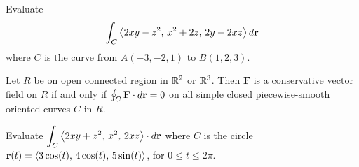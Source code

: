 \documentclass[../mathNotesPreamble]{subfiles}
\begin{document}
  \begin{ex*}
    Evaluate
      \[\int_C {\left\langle 2xy-z^2,\, x^2+2z,\,2y-2xz \right\rangle}\,d{\mathbf{r}}\]
    where $C$ is the curve from $A(-3,-2,1)$ to $B(1,2,3)$.
  \end{ex*}
  \pagebreak

  \begin{thmBox*}
    Let $R$ be on open connected region in $\mathbb{R}^2$ or $\mathbb{R}^3$. Then $\mathbf F$ is a conservative vector field on $R$ if and only if $\oint_C \mathbf F\cdot d{\mathbf{r}}=0$ on all simple closed piecewise-smooth oriented curves $C$ in $R$.
  \end{thmBox*}

  \begin{ex*}
    Evaluate $\displaystyle \int_C {\left\langle 2xy+z^2,\,x^2,\,2xz \right\rangle}\cdot d{\mathbf{r}}$ where $C$ is the circle \newline${\mathbf{r}}(t)={\left\langle 3\cos(t),\,4\cos(t),\,5\sin(t) \right\rangle}$, for $0\leq t\leq 2\pi$.
  \end{ex*}

  \pagebreak
  
\end{document}
